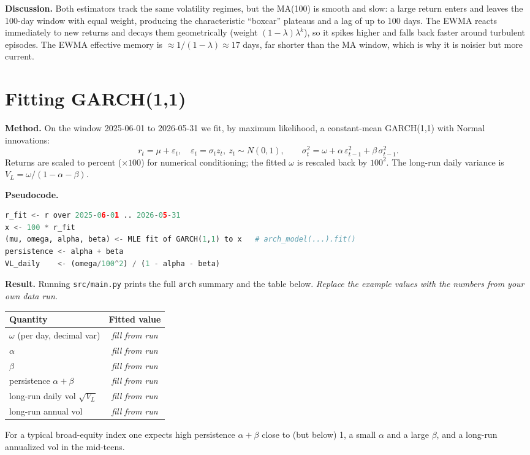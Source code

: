\documentclass[11pt]{article}
\newcommand{\VL}{V_L}
\begin{document}
\textbf{Discussion.} Both estimators track the same volatility regimes, but the
MA(100) is smooth and slow: a large return enters and leaves the 100-day window
with equal weight, producing the characteristic ``boxcar'' plateaus and a lag
of up to 100 days. The EWMA reacts immediately to new returns and decays them
geometrically (weight $(1-\lambda)\lambda^{k}$), so it spikes higher and falls
back faster around turbulent episodes. The EWMA effective memory is
$\approx 1/(1-\lambda)\approx 17$ days, far shorter than the MA window, which is
why it is noisier but more current.

\section{Fitting GARCH(1,1)}
\textbf{Method.} On the window 2025-06-01 to 2026-05-31 we fit, by maximum
likelihood, a constant-mean GARCH(1,1) with Normal innovations:
\[
r_t=\mu+\varepsilon_t,\quad \varepsilon_t=\sigma_t z_t,\ z_t\sim N(0,1),\qquad
\sigma_t^2=\omega+\alpha\,\varepsilon_{t-1}^2+\beta\,\sigma_{t-1}^2 .
\]
Returns are scaled to percent ($\times100$) for numerical conditioning; the
fitted $\omega$ is rescaled back by $100^2$. The long-run daily variance is
$\VL=\omega/(1-\alpha-\beta)$.

\textbf{Pseudocode.}
\begin{lstlisting}[language=Python]
r_fit <- r over 2025-06-01 .. 2026-05-31
x <- 100 * r_fit
(mu, omega, alpha, beta) <- MLE fit of GARCH(1,1) to x   # arch_model(...).fit()
persistence <- alpha + beta
VL_daily    <- (omega/100^2) / (1 - alpha - beta)
\end{lstlisting}

\textbf{Result.} Running \texttt{src/main.py} prints the full \texttt{arch}
summary and the table below. \emph{Replace the example values with the numbers
from your own data run.}
\begin{center}
\begin{tabular}{lc}
\toprule
Quantity & Fitted value \\
\midrule
$\omega$ (per day, decimal var) & \textit{fill from run} \\
$\alpha$                        & \textit{fill from run} \\
$\beta$                         & \textit{fill from run} \\
persistence $\alpha+\beta$      & \textit{fill from run} \\
long-run daily vol $\sqrt{\VL}$ & \textit{fill from run} \\
long-run annual vol             & \textit{fill from run} \\
\bottomrule
\end{tabular}
\end{center}
For a typical broad-equity index one expects high persistence
$\alpha+\beta$ close to (but below) 1, a small $\alpha$ and a large $\beta$, and
a long-run annualized vol in the mid-teens.
\end{document}
